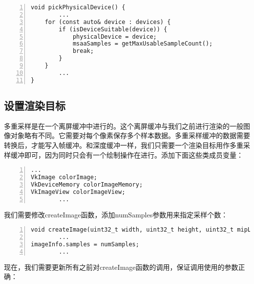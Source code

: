 \documentclass{ctexart}
\begin{document}
\begin{lstlisting}[language={[ANSI]C},keywordstyle=\color{blue!70},commentstyle=\color{red!50!green!50!blue!50},frame=shadowbox, rulesepcolor=\color{red!20!green!20!blue!20},basicstyle=\small,numbers=left, numberstyle=\tiny,breaklines=true]
void pickPhysicalDevice() {
		...
	for (const auto& device : devices) {
		if (isDeviceSuitable(device)) {
			physicalDevice = device;
			msaaSamples = getMaxUsableSampleCount();
			break;
		}
	}
		...
}
\end{lstlisting}

\subsection{设置渲染目标}

多重采样是在一个离屏缓冲中进行的。这个离屏缓冲与我们之前进行渲染的一般图像对象略有不同。它需要对每个像素保存多个样本数据。多重采样缓冲的数据需要转换后，才能写入帧缓冲。和深度缓冲一样，我们只需要一个渲染目标用作多重采样缓冲即可，因为同时只会有一个绘制操作在进行。添加下面这些类成员变量：

\begin{lstlisting}[language={[ANSI]C},keywordstyle=\color{blue!70},commentstyle=\color{red!50!green!50!blue!50},frame=shadowbox, rulesepcolor=\color{red!20!green!20!blue!20},basicstyle=\small,numbers=left, numberstyle=\tiny,breaklines=true]
		...
VkImage colorImage;
VkDeviceMemory colorImageMemory;
VkImageView colorImageView;
		...
\end{lstlisting}

我们需要修改createImage函数，添加numSamples参数用来指定采样个数：

\begin{lstlisting}[language={[ANSI]C},keywordstyle=\color{blue!70},commentstyle=\color{red!50!green!50!blue!50},frame=shadowbox, rulesepcolor=\color{red!20!green!20!blue!20},basicstyle=\small,numbers=left, numberstyle=\tiny,breaklines=true]
void createImage(uint32_t width, uint32_t height, uint32_t mipLevels, VkSampleCountFlagBits numSamples, VkFormat format, VkImageTiling tiling, VkImageUsageFlags usage, VkMemoryPropertyFlags properties, VkImage& image, VkDeviceMemory& imageMemory) {
		...
imageInfo.samples = numSamples;
		...
\end{lstlisting}

现在，我们需要更新所有之前对createImage函数的调用，保证调用使用的参数正确：
\end{document}
